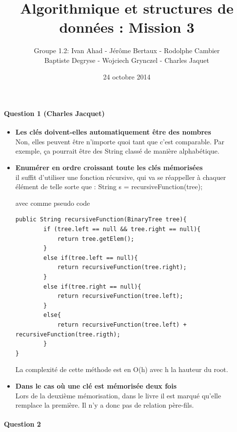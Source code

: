 \documentclass[a4paper]{article}
\title{Algorithmique et structures de données : Mission 3}
\date{24 octobre 2014}
\author{Groupe 1.2: Ivan Ahad - Jérôme Bertaux - Rodolphe Cambier \\ 
	Baptiste Degryse - Wojciech Grynczel - Charles Jaquet}
\begin{document}
\maketitle

\paragraph*{Question 1 (Charles Jacquet)}
\begin{itemize}
\item{\textbf{Les clés doivent-elles automatiquement être des nombres}}\\
Non, elles peuvent être n'importe quoi tant que c'est comparable.
Par exemple, ça pourrait être des String classé de manière alphabétique.
\item{\textbf{Enumérer en ordre croissant toute les clés mémorisées}}\\
il suffit d'utiliser une fonction récursive, qui va se réappeller à chaquer élément de telle sorte que :
String s = recursiveFunction(tree);

avec comme pseudo code
\begin{verbatim}
public String recursiveFunction(BinaryTree tree){
		if (tree.left == null && tree.right == null){
			return tree.getElem();
		}
		else if(tree.left == null){
			return recursiveFunction(tree.right);
		}
		else if(tree.right == null){
			return recursiveFunction(tree.left);
		}
		else{
			return recursiveFunction(tree.left) + recursiveFunction(tree.rigth);
		}
}
\end{verbatim}
La complexité de cette méthode est en O(h) avec h la hauteur du root.

\item{\textbf{Dans le cas où une clé est mémorisée deux fois}}\\
Lors de la deuxième mémorisation, dans le livre il est marqué qu'elle remplace la première. Il n'y a donc pas de relation père-fils.

\end{itemize}
\paragraph*{Question 2}
\end{document}
